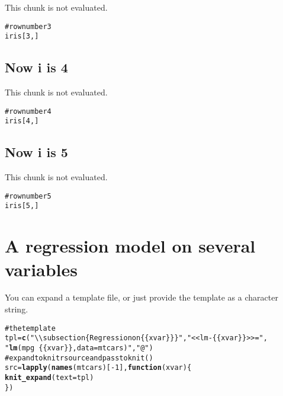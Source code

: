 \documentclass{article}\usepackage[]{graphicx}\usepackage[]{color}
\makeatletter
\newcommand{\hlfunctioncall}[1]{\textcolor[rgb]{0.501960784313725,0,0.329411764705882}{\textbf{#1}}}%
\newcommand{\hlstring}[1]{\textcolor[rgb]{0.6,0.6,1}{#1}}%
\newcommand{\hlcomment}[1]{\textcolor[rgb]{0.180392156862745,0.6,0.341176470588235}{#1}}%
\newenvironment{kframe}{%
 \def\at@end@of@kframe{}%
 \ifinner\ifhmode%
  \def\at@end@of@kframe{\end{minipage}}%
  \begin{minipage}{\columnwidth}%
 \fi\fi%
 \def\FrameCommand##1{\hskip\@totalleftmargin \hskip-\fboxsep
 \colorbox{shadecolor}{##1}\hskip-\fboxsep
     \hskip-\linewidth \hskip-\@totalleftmargin \hskip\columnwidth}%
 \MakeFramed {\advance\hsize-\width
   \@totalleftmargin\z@ \linewidth\hsize
   \@setminipage}}%
 {\par\unskip\endMakeFramed%
 \at@end@of@kframe}
\newenvironment{knitrout}{}{} %
\makeatother
\begin{document}
This chunk is not evaluated.
\begin{knitrout}
\color{fgcolor}\begin{kframe}
\begin{alltt}
\hlcomment{# row number 3}
iris[3, ]
\end{alltt}
\end{kframe}
\end{knitrout}

\subsection{Now i is 4}

This chunk is not evaluated.
\begin{knitrout}
\color{fgcolor}\begin{kframe}
\begin{alltt}
\hlcomment{# row number 4}
iris[4, ]
\end{alltt}
\end{kframe}
\end{knitrout}

\subsection{Now i is 5}

This chunk is not evaluated.
\begin{knitrout}
\color{fgcolor}\begin{kframe}
\begin{alltt}
\hlcomment{# row number 5}
iris[5, ]
\end{alltt}
\end{kframe}
\end{knitrout}


\section{A regression model on several variables}

You can expand a template file, or just provide the template as a character string.

\begin{knitrout}
\color{fgcolor}\begin{kframe}
\begin{alltt}
\hlcomment{# the template}
tpl = \hlfunctioncall{c}(\hlstring{"\textbackslash{}\textbackslash{}subsection\{Regression on \{\{xvar\}\}\}"}, \hlstring{"<<lm-\{\{xvar\}\}>>="}, 
    \hlstring{"\hlfunctioncall{lm}(mpg~\{\{xvar\}\}, data=mtcars)"}, \hlstring{"@"})
\hlcomment{# expand to knitr source and pass to knit()}
src = \hlfunctioncall{lapply}(\hlfunctioncall{names}(mtcars)[-1], \hlfunctioncall{function}(xvar) \{
    \hlfunctioncall{knit_expand}(text = tpl)
\})
\end{alltt}
\end{kframe}
\end{knitrout}
\end{document}
